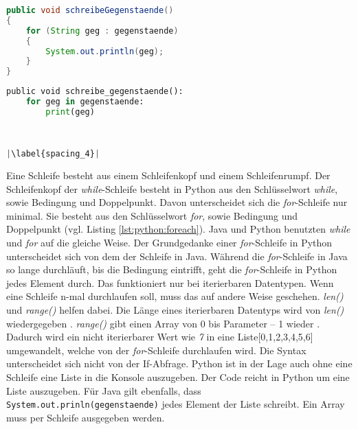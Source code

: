 \begin{minipage}{.5\linewidth}
\begin{lstlisting}[language=java,caption={foreach-Schleife Java},captionpos=b,label={lst:java:foreach},frame=none]
public void schreibeGegenstaende()
{
    for (String geg : gegenstaende)
    {
        System.out.println(geg);
    }
}
\end{lstlisting}
\end{minipage}
\begin{minipage}{.5\linewidth}
\begin{lstlisting}[language=python,caption={foreach-Schleife Python},captionpos=b,label={lst:python:foreach},frame=l,escapechar=|]
public void schreibe_gegenstaende():
    for geg in gegenstaende:
        print(geg)
        
        

|\label{spacing_4}|
\end{lstlisting}
\end{minipage}

Eine Schleife besteht aus einem Schleifenkopf und einem Schleifenrumpf. Der Schleifenkopf der \textit{while}-Schleife besteht in Python aus den Schlüsselwort \textit{while}, sowie Bedingung und Doppelpunkt. Davon unterscheidet sich die \textit{for}-Schleife nur minimal. Sie besteht aus den Schlüsselwort \textit{for}, sowie Bedingung und Doppelpunkt (vgl. Listing \ref{lst:python:foreach}). Java und Python benutzten \textit{while} und \textit{for} auf die gleiche Weise. Der Grundgedanke einer \textit{for}-Schleife in Python unterscheidet sich von dem der Schleife in Java. Während die \textit{for}-Schleife in Java so lange durchläuft, bis die Bedingung eintrifft, geht die \textit{for}-Schleife in Python jedes Element durch. Das funktioniert nur bei iterierbaren Datentypen. Wenn eine Schleife n-mal durchlaufen soll, muss das auf andere Weise geschehen. \textit{len()} und \textit{range()} helfen dabei. Die Länge eines iterierbaren Datentyps wird von \textit{len()} wiedergegeben \cite{w3school_len}. \textit{range()} gibt einen Array von 0 bis Parameter – 1 wieder \cite{w3school_range}. Dadurch wird ein nicht iterierbarer Wert wie \textit{7} in eine Liste[0,1,2,3,4,5,6] umgewandelt, welche von der \textit{for}-Schleife durchlaufen wird. Die Syntax unterscheidet sich nicht von der If-Abfrage. Python ist in der Lage auch ohne eine Schleife eine Liste in die Konsole auszugeben. Der Code  reicht in Python um eine Liste auszugeben. Für Java gilt ebenfalls, dass \texttt{System.out.prinln(gegenstaende)} jedes Element der Liste schreibt. Ein Array muss per Schleife ausgegeben werden. \cite{Python3:Buch}\cite{Louis:2010}
\par
